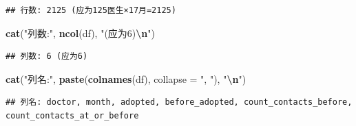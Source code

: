 \documentclass[
]{article}
\newenvironment{Shaded}{\begin{snugshade}}{\end{snugshade}}
\newcommand{\AttributeTok}[1]{\textcolor[rgb]{0.13,0.29,0.53}{#1}}
\newcommand{\CommentTok}[1]{\textcolor[rgb]{0.56,0.35,0.01}{\textit{#1}}}
\newcommand{\FunctionTok}[1]{\textcolor[rgb]{0.13,0.29,0.53}{\textbf{#1}}}
\newcommand{\NormalTok}[1]{#1}
\newcommand{\OtherTok}[1]{\textcolor[rgb]{0.56,0.35,0.01}{#1}}
\newcommand{\SpecialCharTok}[1]{\textcolor[rgb]{0.81,0.36,0.00}{\textbf{#1}}}
\newcommand{\StringTok}[1]{\textcolor[rgb]{0.31,0.60,0.02}{#1}}
\begin{document}
\begin{Shaded}
\end{Shaded}

\begin{verbatim}
## 行数: 2125 (应为125医生×17月=2125)
\end{verbatim}

\begin{Shaded}
\begin{Highlighting}[]
\FunctionTok{cat}\NormalTok{(}\StringTok{"列数:"}\NormalTok{, }\FunctionTok{ncol}\NormalTok{(df), }\StringTok{"(应为6)}\SpecialCharTok{\textbackslash{}n}\StringTok{"}\NormalTok{)}
\end{Highlighting}
\end{Shaded}

\begin{verbatim}
## 列数: 6 (应为6)
\end{verbatim}

\begin{Shaded}
\begin{Highlighting}[]
\FunctionTok{cat}\NormalTok{(}\StringTok{"列名:"}\NormalTok{, }\FunctionTok{paste}\NormalTok{(}\FunctionTok{colnames}\NormalTok{(df), }\AttributeTok{collapse =} \StringTok{", "}\NormalTok{), }\StringTok{"}\SpecialCharTok{\textbackslash{}n}\StringTok{"}\NormalTok{)}
\end{Highlighting}
\end{Shaded}

\begin{verbatim}
## 列名: doctor, month, adopted, before_adopted, count_contacts_before, count_contacts_at_or_before
\end{verbatim}
\end{document}
